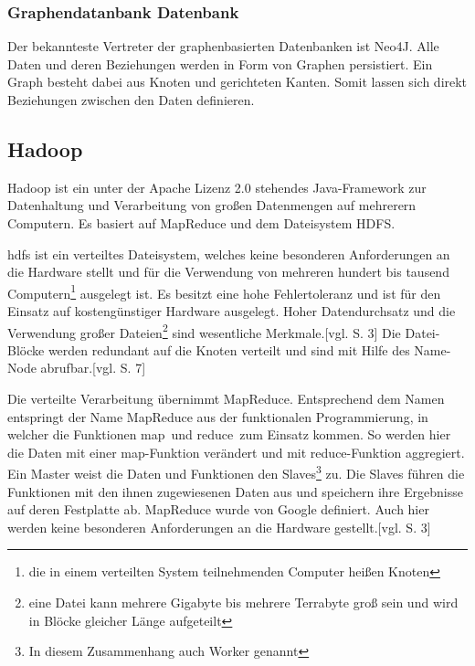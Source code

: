 \subsubsection{Graphendatanbank Datenbank}

Der bekannteste Vertreter der graphenbasierten Datenbanken ist Neo4J.
Alle Daten und deren Beziehungen werden in Form von Graphen persistiert.
Ein Graph besteht dabei aus Knoten und gerichteten Kanten.
Somit lassen sich direkt Beziehungen zwischen den Daten definieren.



\subsection{Hadoop}

Hadoop ist ein unter der Apache Lizenz 2.0 stehendes Java-Framework zur Datenhaltung und Verarbeitung von großen Datenmengen auf mehrerern Computern.
Es basiert auf MapReduce und dem Dateisystem HDFS.

\Gls{hdfs} ist ein verteiltes Dateisystem, welches keine besonderen Anforderungen an die Hardware stellt und für die Verwendung von mehreren hundert bis tausend Computern\footnote{die in einem verteilten System teilnehmenden Computer heißen Knoten} ausgelegt ist.
Es besitzt eine hohe Fehlertoleranz und ist für den Einsatz auf kostengünstiger Hardware ausgelegt.
Hoher Datendurchsatz und die Verwendung großer Dateien\footnote{eine Datei kann mehrere Gigabyte bis mehrere Terrabyte groß sein und wird in Blöcke gleicher Länge aufgeteilt} sind wesentliche Merkmale.[vgl. \cite{paper:hadoop} S. 3]
Die Datei-Blöcke werden redundant auf die Knoten verteilt und sind mit Hilfe des Name-Node abrufbar.[vgl. \cite{ba:dan} S. 7]

Die verteilte Verarbeitung übernimmt MapReduce.
Entsprechend dem Namen entspringt der Name MapReduce aus der funktionalen Programmierung, in welcher die Funktionen \glqq map\grqq \ und \glqq reduce\grqq \ zum Einsatz kommen.
So werden hier die Daten mit einer map-Funktion verändert und mit reduce-Funktion aggregiert.
Ein Master weist die Daten und Funktionen den Slaves\footnote{In diesem Zusammenhang auch Worker genannt} zu.
Die Slaves führen die Funktionen mit den ihnen zugewiesenen Daten aus und speichern ihre Ergebnisse auf deren Festplatte ab.
MapReduce wurde von Google definiert.
Auch hier werden keine besonderen Anforderungen an die Hardware gestellt.[vgl. \cite{paper:mapreduce} S. 3]


